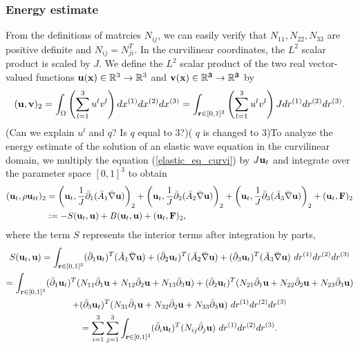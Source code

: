 \documentclass[a4paper]{article}
\begin{document}
\subsubsection{Energy estimate}
From the definitions of matrcies $N_{ij}$, we can easily verify that $N_{11}, N_{22}, N_{33}$ are positive definite and $N_{ij} = N_{ji}^T$. In the curvilinear coordinates, the $L^2$ scalar product is scaled by $J$. We define the $L^2$ scalar product of the two real vector-valued functions ${\bf u}({\bf x})\in\mathbb{R}^3\rightarrow \mathbb{R}^3$ and ${\bf v}(\bf x)\in\mathbb{R}^3\rightarrow \mathbb{R}^3$ by
\begin{equation*}
({\bf u},{\bf v})_2 = \int_{\Omega}  \left(\sum_{l=1}^3 u^{l}v^{l}\right)dx^{(1)}dx^{(2)}dx^{(3)} = \int_{{\bf r}\in[0,1]^3} \left(\sum_{l=1}^3 u^{l}v^{l}\right)Jdr^{(1)}dr^{(2)}dr^{(3)}.
\end{equation*}
{\color{red}(Can we explain $u^l$ and $q$? Is $q$ equal to 3?)}{\color{blue}( $q$ is changed to $3$)}To analyze the energy estimate of the solution of an elastic wave equation in the curvilinear domain, we multiply the equation (\ref{elastic_eq_curvi}) by $J{\bf u}_t$ and integrate over the parameter space $[0,1]^3$ to obtain
\begin{align}\label{time_deri_curvi}
({\bf u}_t,\rho {\bf u}_{tt})_2 &= \left({\bf u}_t,\frac{1}{J}\bar{\partial}_1(\bar{A}_1\bar{\nabla}{\bf u})\right)_2+ \left({\bf u}_t,\frac{1}{J}\bar{\partial}_2(\bar{A}_2\bar{\nabla}{\bf u})\right)_2+ \left({\bf u}_t,\frac{1}{J}\bar{\partial}_3(\bar{A}_3\bar{\nabla}{\bf u})\right)_2+({\bf u}_t, {\bf F})_2\nonumber\\
&:= -S({\bf u}_t,{\bf u}) + B({\bf u}_t,{\bf u}) + ({\bf u}_t,{\bf F})_2,
\end{align}
where the term $S$ represents the interior terms after integration by parts,
\begin{multline*}
S({\bf u}_t,{\bf u}) = \int_{{\bf r}\in[0,1]^3} (\bar{\partial}_1 {\bf u}_t)^T ({\bar A}_1\bar{\nabla}{\bf u}) + (\bar{\partial}_2 {\bf u}_t)^T ({\bar A}_2\bar{\nabla}{\bf u}) + (\bar{\partial}_3 {\bf u}_t)^T ({\bar A}_3\bar{\nabla}{\bf u})\ dr^{(1)}dr^{(2)}dr^{(3)}\\
 = \int_{{\bf r}\in[0,1]^3} (\bar{\partial}_1 {\bf u}_t)^T (N_{11}\bar{\partial}_1{\bf u} +N_{12}\bar{\partial}_2{\bf u}+ N_{13}\bar{\partial}_3{\bf u}) + (\bar{\partial}_2 {\bf u}_t)^T (N_{21}\bar{\partial}_1{\bf u} +N_{22}\bar{\partial}_2{\bf u}+ N_{23}\bar{\partial}_3{\bf u}) \\
 +(\bar{\partial}_3 {\bf u}_t)^T (N_{31}\bar{\partial}_1{\bf u} +N_{32}\bar{\partial}_2{\bf u}+ N_{33}\bar{\partial}_3{\bf u})\ dr^{(1)}dr^{(2)}dr^{(3)}\\
 = \sum_{i = 1}^3\sum_{j=1}^3  \int_{{\bf r}\in[0,1]^3} (\bar{\partial}_i {\bf u}_t)^T(N_{ij}\bar{\partial}_j {\bf u})\ dr^{(1)}dr^{(2)}dr^{(3)}.
\end{multline*}
\end{document}
